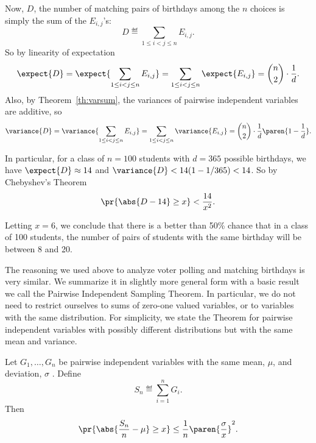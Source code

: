 Now, $D$, the number of matching pairs of birthdays among the $n$
choices is simply the sum of the $E_{i,j}$'s:
\begin{equation}\label{Vn}
D \eqdef \sum_{1\le i < j \le n} E_{i,j}.
\end{equation}
So by linearity of expectation
\[
\expect{D} = \expect{\sum_{1\le i < j \le n} E_{i,j}} = 
               \sum_{1\le i < j \le n} \expect{E_{i,j}} =
               \binom{n}{2}\cdot \frac{1}{d}.
\]
Also, by Theorem~\ref{th:varsum}, the variances of pairwise independent
variables are additive, so
\[
\variance{D} = \variance{\sum_{1\le i < j \le n} E_{i,j}} = 
               \sum_{1\le i < j \le n} \variance{E_{i,j}} =
               \binom{n}{2} \cdot \frac{1}{d}\paren{1-\frac{1}{d}}.
\]

In particular, for a class of $n= 100$ students with $d=365$ possible
birthdays, we have $\expect{D} \approx 14$ and $\variance{D} < 14 (1-
1/365) < 14$.  So by Chebyshev's Theorem
\[
\pr{\abs{D - 14} \geq x} < \frac{14}{x^2}.
\]

Letting $x=6$, we conclude that there is a better than 50\% chance that in
a class of 100 students, the number of pairs of students with the same
birthday will be between 8 and 20.  

The reasoning we used above to analyze voter polling and matching
birthdays is very similar.  We summarize it in slightly more general form
with a basic result we call the Pairwise Independent Sampling Theorem.  In
particular, we do not need to restrict ourselves to sums of zero-one
valued variables, or to variables with the same distribution.  For
simplicity, we state the Theorem for pairwise independent variables with
possibly different distributions but with the same mean and variance.

\begin{theorem*}
Let $G_1, \dots, G_n$ be pairwise independent variables with the same
mean, $\mu$, and deviation, $\sigma$ .  Define
\begin{equation}\label{ln14.Sn}
S_n \eqdef \sum_{i=1}^n G_i.
\end{equation}
Then
\[
\pr{\abs{\frac{S_n}{n} - \mu} \geq x}
    \leq \frac{1}{n} \paren{\frac{\sigma}{x}}^2.
\]
\end{theorem*}

